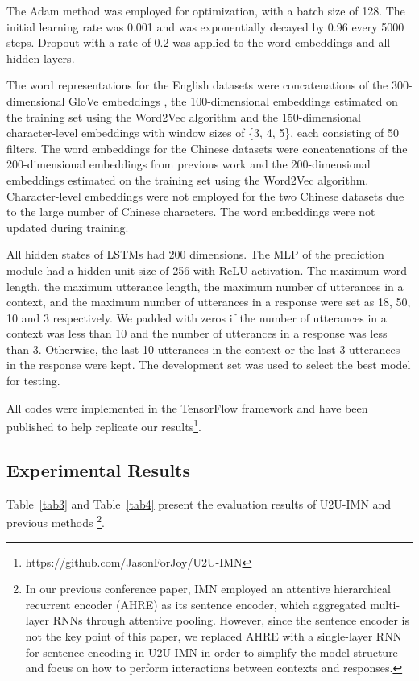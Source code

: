 \documentclass[journal]{IEEEtran}
\begin{document}
    The Adam method \cite{DBLP:journals/corr/KingmaB14} was employed for optimization, with a batch size of 128.
    The initial learning rate was 0.001 and was exponentially decayed by 0.96 every 5000 steps.
    Dropout \cite{DBLP:journals/jmlr/SrivastavaHKSS14} with a rate of 0.2 was applied to the word embeddings and all hidden layers.

    The word representations for the English datasets were concatenations of the 300-dimensional GloVe embeddings \cite{DBLP:conf/emnlp/PenningtonSM14}, the 100-dimensional embeddings estimated on the training set using the Word2Vec algorithm \cite{DBLP:conf/nips/MikolovSCCD13} and the 150-dimensional character-level embeddings with window sizes of \{3, 4,  5\}, each consisting of 50 filters.
    The word embeddings for the Chinese datasets were concatenations of the 200-dimensional embeddings from previous work \cite{DBLP:conf/naacl/SongSLZ18} and the 200-dimensional embeddings estimated on the training set using the Word2Vec algorithm. Character-level embeddings were not employed for the two Chinese datasets due to the large number of Chinese characters.
    The word embeddings were not updated during training.

    All hidden states of LSTMs had 200 dimensions.
    The MLP of the prediction module had a hidden unit size of 256 with ReLU \cite{DBLP:conf/icml/NairH10} activation.
    The maximum word length, the maximum utterance length, the maximum number of utterances in a context, and the maximum number of utterances in a response were set as 18, 50, 10 and 3 respectively. We padded with zeros if the number of utterances in a context was less than 10 and the number of utterances in a response was less than 3.
    Otherwise, the last 10 utterances in the context or the last 3 utterances in the response were kept.
    The development set was used to select the best model for testing.

    All codes were implemented in the TensorFlow framework \cite{DBLP:conf/osdi/AbadiBCCDDDGIIK16} and have been published to help replicate our results\footnote{https://github.com/JasonForJoy/U2U-IMN}.

  \subsection{Experimental Results}

Table~\ref{tab3} and Table~\ref{tab4} present the evaluation results of U2U-IMN and previous methods \footnote{In our previous conference paper, IMN employed an attentive hierarchical recurrent encoder (AHRE) as its sentence encoder, which aggregated multi-layer RNNs through attentive pooling.
    However, since the sentence encoder is not the key point of this paper, we replaced AHRE with a single-layer RNN for sentence encoding in U2U-IMN in order to simplify the model structure and focus on how to perform interactions between contexts and responses.}.
\end{document}
